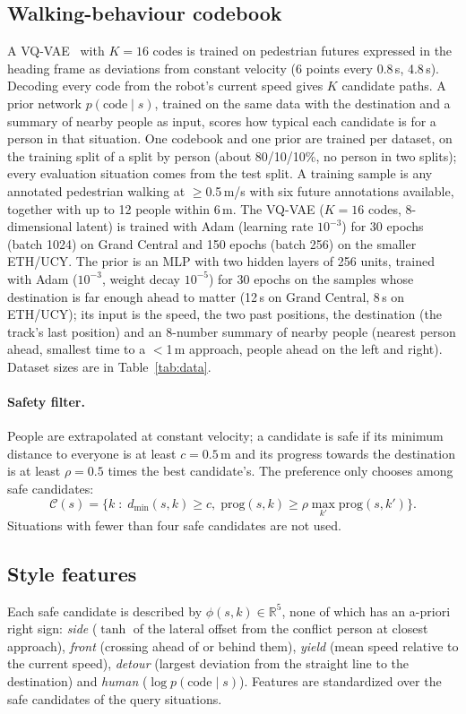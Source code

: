 \subsection{Walking-behaviour codebook}
\label{sec:candidates}
A VQ-VAE~\citep{vandenoord2017neural} with $K=16$ codes is trained on pedestrian futures expressed in the heading frame as deviations
from constant velocity (6 points every 0.8\,s, 4.8\,s). Decoding every code from the robot's current speed gives $K$ candidate paths.
A prior network $p(\text{code} \mid s)$, trained on the same data with the destination and a summary of nearby people as input,
scores how typical each candidate is for a person in that situation.
One codebook and one prior are trained per dataset, on the training split of a split by person (about 80/10/10\%, no person in two
splits); every evaluation situation comes from the test split. A training sample is any annotated pedestrian walking at
$\ge$0.5\,m/s with six future annotations available, together with up to 12 people within 6\,m. The VQ-VAE ($K=16$ codes,
8-dimensional latent) is trained with Adam (learning rate $10^{-3}$) for 30 epochs (batch 1024) on Grand Central and 150 epochs
(batch 256) on the smaller ETH/UCY. The prior is an MLP with two hidden layers of 256 units, trained with Adam ($10^{-3}$, weight decay
$10^{-5}$) for 30 epochs on the samples whose destination is far enough ahead to matter (12\,s on Grand Central, 8\,s on ETH/UCY);
its input is the speed, the two past positions, the destination (the track's last position) and an 8-number summary of nearby people
(nearest person ahead, smallest time to a $<$1\,m approach, people ahead on the left and right). Dataset sizes are in Table~\ref{tab:data}.

\paragraph{Safety filter.}
People are extrapolated at constant velocity; a candidate is safe if its minimum distance to everyone is at least $c=0.5$\,m and its
progress towards the destination is at least $\rho=0.5$ times the best candidate's. The preference only chooses among safe candidates:
\begin{equation}
  \mathcal{C}(s) = \bigl\{ k \;:\; d_{\min}(s,k) \ge c,\; \mathrm{prog}(s,k) \ge \rho \max_{k'} \mathrm{prog}(s,k') \bigr\}.
  \label{eq:safe}
\end{equation}
Situations with fewer than four safe candidates are not used.

\subsection{Style features}
Each safe candidate is described by $\phi(s,k) \in \mathbb{R}^5$, none of which has an a-priori right sign:
\emph{side} ($\tanh$ of the lateral offset from the conflict person at closest approach),
\emph{front} (crossing ahead of or behind them), \emph{yield} (mean speed relative to the current speed),
\emph{detour} (largest deviation from the straight line to the destination) and \emph{human} ($\log p(\text{code}\mid s)$).
Features are standardized over the safe candidates of the query situations.

